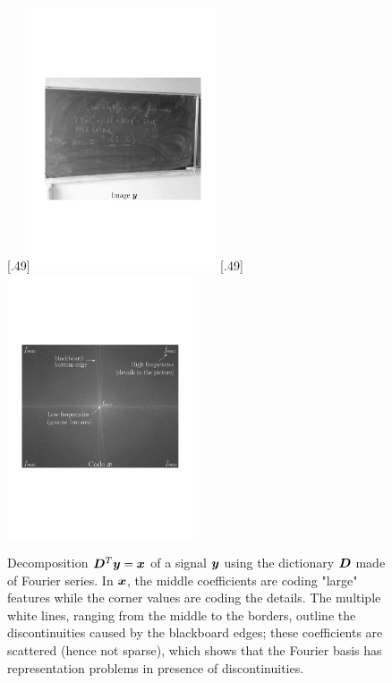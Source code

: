 \begin{figure}[!ht]
%
  [.49\linewidth]{\includegraphics[width=0.49\textwidth]{figures/fourier/image.pdf}}
  [.49\linewidth]{\includegraphics[width=0.49\textwidth]{figures/fourier/fourier.pdf}}
  \caption{Decomposition $\bm{D}^T\bm{y}=\bm{x}$ of a signal $\bm{y}$ using the dictionary $\bm{D}$ made of Fourier series. In $\bm{x}$, the middle coefficients are coding "large" features while the corner values are coding the details. The multiple white lines, ranging from the middle to the borders, outline the discontinuities caused by the blackboard edges; these coefficients are scattered (hence not sparse), which shows that the Fourier basis has representation problems in presence of discontinuities.} \label{fig_fourier}
\end{figure}


